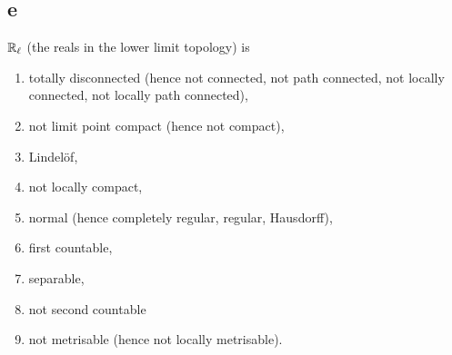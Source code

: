 \subsection*{e}
  $\mathbb{R}_\ell$ (the reals in the lower limit topology) is
  \begin{enumerate}
  \item totally disconnected (hence not connected, not path connected, not locally connected, not locally path connected),
  \item not limit point compact (hence not compact),
  \item Lindel\"of,
  \item not locally compact,
  \item normal (hence completely regular, regular, Hausdorff),
  \item first countable,
  \item separable,
  \item not second countable
  \item not metrisable (hence not locally metrisable).
  \end{enumerate}

